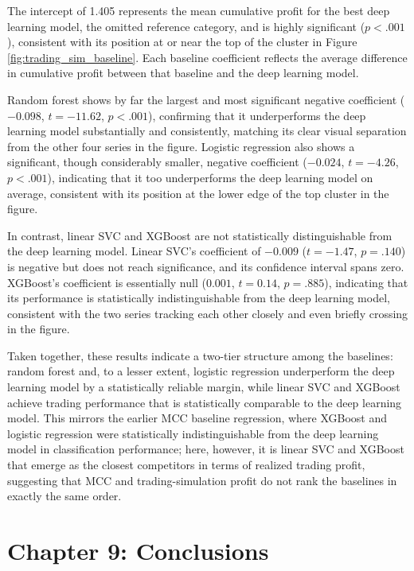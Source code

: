 \documentclass[stu,floatsintext]{apa7}
\begin{document}
The intercept of 1.405 represents the mean cumulative profit for the best deep learning model, the omitted reference category, and is highly significant ($p < .001$), consistent with its position at or near the top of the cluster in Figure \ref{fig:trading_sim_baseline}. Each baseline coefficient reflects the average difference in cumulative profit between that baseline and the deep learning model.

Random forest shows by far the largest and most significant negative coefficient ($-0.098$, $t = -11.62$, $p < .001$), confirming that it underperforms the deep learning model substantially and consistently, matching its clear visual separation from the other four series in the figure. Logistic regression also shows a significant, though considerably smaller, negative coefficient ($-0.024$, $t = -4.26$, $p < .001$), indicating that it too underperforms the deep learning model on average, consistent with its position at the lower edge of the top cluster in the figure.

In contrast, linear SVC and XGBoost are not statistically distinguishable from the deep learning model. Linear SVC's coefficient of $-0.009$ ($t = -1.47$, $p = .140$) is negative but does not reach significance, and its confidence interval spans zero. XGBoost's coefficient is essentially null ($0.001$, $t = 0.14$, $p = .885$), indicating that its performance is statistically indistinguishable from the deep learning model, consistent with the two series tracking each other closely and even briefly crossing in the figure.

Taken together, these results indicate a two-tier structure among the baselines: random forest and, to a lesser extent, logistic regression underperform the deep learning model by a statistically reliable margin, while linear SVC and XGBoost achieve trading performance that is statistically comparable to the deep learning model. This mirrors the earlier MCC baseline regression, where XGBoost and logistic regression were statistically indistinguishable from the deep learning model in classification performance; here, however, it is linear SVC and XGBoost that emerge as the closest competitors in terms of realized trading profit, suggesting that MCC and trading-simulation profit do not rank the baselines in exactly the same order.

\clearpage
\section{Chapter 9: Conclusions}
\end{document}
